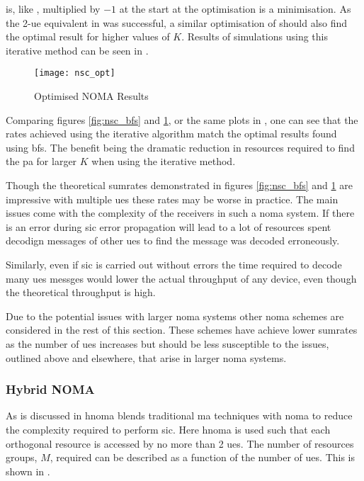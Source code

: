\par
{} is, like , multiplied by $-1$ at the start at the optimisation is a minimisation.
As the 2-\ac{ue} equivalent in  was successful, a similar optimisation of  should also find the optimal result for higher values of $K$.
Results of simulations using this iterative method can be seen in .

\begin{figure}[H]
	\centering
	\texttt{[image: nsc\_opt]}
	\caption{Optimised NOMA Results}
	\label{fig:nsc_opt}
\end{figure}

\par
Comparing figures \ref{fig:nsc_bfs} and \ref{fig:nsc_opt}, or the same plots in , one can see that the rates achieved using the iterative algorithm match the optimal results found using \ac{bfs}.
The benefit being the dramatic reduction in resources required to find the \ac{pa} for larger $K$ when using the iterative method.

\par
Though the theoretical sumrates demonstrated in figures \ref{fig:nsc_bfs} and \ref{fig:nsc_opt} are impressive with multiple \acp{ue} these rates may be worse in practice.
The main issues come with the complexity of the receivers in such a \ac{noma} system.
If there is an error during \ac{sic} error propagation will lead to a lot of resources spent decodign messages of other \acp{ue} to find the message was decoded erroneously.

\par
Similarly, even if \ac{sic} is carried out without errors the time required to decode many \acp{ue} messges would lower the actual throughput of any device, even though the theoretical throughput is high.

\par
Due to the potential issues with larger \ac{noma} systems other \ac{noma} schemes are considered in the rest of this section.
These schemes have achieve lower sumrates as the number of \acp{ue} increases but should be less susceptible to the issues, outlined above and elsewhere, that arise in larger \ac{noma} systems.

\subsubsection{Hybrid NOMA}
As is discussed in  \ac{hnoma} blends traditional \ac{ma} techniques with \ac{noma} to reduce the complexity required to perform \ac{sic}.
Here \ac{hnoma} is used such that each orthogonal resource is accessed by no more than 2 \acp{ue}.
The number of resources groups, $M$, required can be described as a function of the number of \acp{ue}.
This is shown in .

